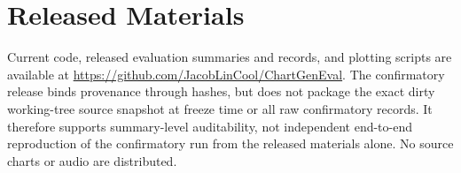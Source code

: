 \documentclass[10pt,twocolumn]{article}
\newcommand{\artifacturl}{\url{https://github.com/JacobLinCool/ChartGenEval}}
\begin{document}
\FloatBarrier

\section{Released Materials}

Current code, released evaluation summaries and records, and plotting scripts
are available at \artifacturl. The confirmatory release binds provenance
through hashes, but does not package the exact dirty working-tree source
snapshot at freeze time or all raw confirmatory records. It therefore supports
summary-level auditability, not independent end-to-end reproduction of the
confirmatory run from the released materials alone. No source charts or audio
are distributed.



\end{document}
